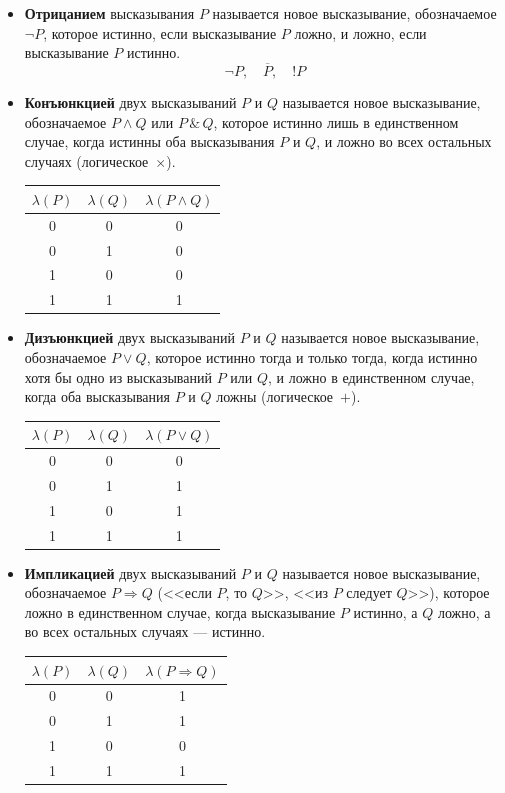 \documentclass[a4paper,11pt]{article}
\begin{document}
\begin{itemize}
  \item \textbf{Отрицанием} высказывания $P$ называется новое высказывание,
    обозначаемое $\neg P$, которое истинно, если высказывание $P$ ложно,
    и ложно, если высказывание $P$ истинно.
    \[ \boxed{\neg P,\quad \overline{P},\quad !P} \]

  \item \textbf{Конъюнкцией} двух высказываний $P$ и $Q$ называется новое
    высказывание, обозначаемое $P \wedge Q$ или $P \,\&\, Q$, которое истинно
    лишь в единственном случае, когда истинны оба высказывания $P$ и $Q$,
    и ложно во всех остальных случаях (логическое~$\times$).
    \begin{center}
    \begin{tabular}{c|c|c}
      $\lambda(P)$ & $\lambda(Q)$ & $\lambda(P \wedge Q)$ \\ \hline
      0 & 0 & 0 \\
      0 & 1 & 0 \\
      1 & 0 & 0 \\
      1 & 1 & 1 \\
    \end{tabular}
    \end{center}

  \item \textbf{Дизъюнкцией} двух высказываний $P$ и $Q$ называется новое
    высказывание, обозначаемое $P \vee Q$, которое истинно тогда и только
    тогда, когда истинно хотя бы одно из высказываний $P$ или $Q$, и ложно
    в единственном случае, когда оба высказывания $P$ и $Q$ ложны
    (логическое~$+$).
    \begin{center}
    \begin{tabular}{c|c|c}
      $\lambda(P)$ & $\lambda(Q)$ & $\lambda(P \vee Q)$ \\ \hline
      0 & 0 & 0 \\
      0 & 1 & 1 \\
      1 & 0 & 1 \\
      1 & 1 & 1 \\
    \end{tabular}
    \end{center}

  \item \textbf{Импликацией} двух высказываний $P$ и $Q$ называется новое
    высказывание, обозначаемое $P \Rightarrow Q$ (<<если $P$, то $Q$>>,
    <<из $P$ следует $Q$>>), которое ложно в единственном случае, когда
    высказывание $P$ истинно, а $Q$ ложно, а во всех остальных случаях ---
    истинно.
    \begin{center}
    \begin{tabular}{c|c|c}
      $\lambda(P)$ & $\lambda(Q)$ & $\lambda(P \Rightarrow Q)$ \\ \hline
      0 & 0 & 1 \\
      0 & 1 & 1 \\
      1 & 0 & 0 \\
      1 & 1 & 1 \\
    \end{tabular}
    \end{center}


\end{itemize}
\end{document}
